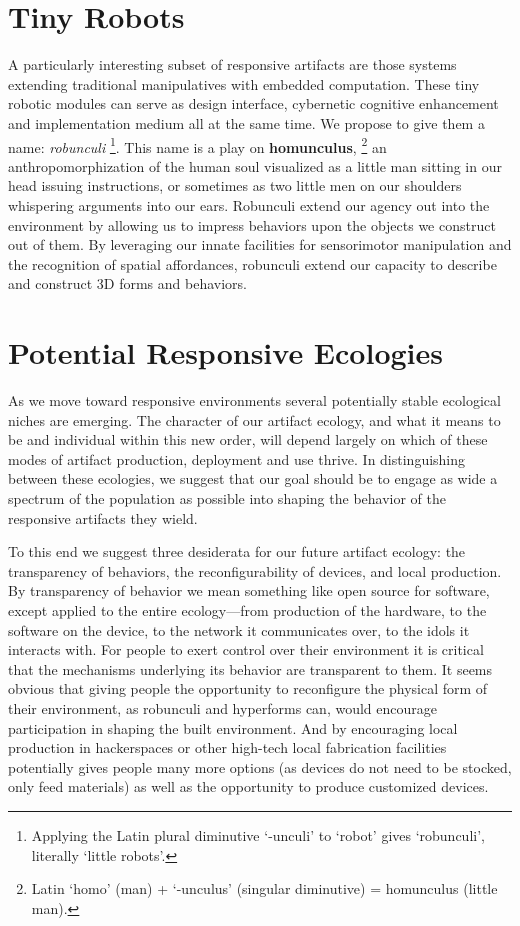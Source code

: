 \section{Tiny Robots}
%
A particularly interesting subset of responsive artifacts are those systems extending traditional manipulatives with embedded computation.
These tiny robotic modules can serve as design interface, cybernetic cognitive enhancement and implementation medium all at the same time. We propose to give them a name: \emph{robunculi}%
\footnote{Applying the Latin plural diminutive `-unculi' to `robot' gives `robunculi', literally `little robots'.}.
This name is a play on \textbf{homunculus},%
\footnote{Latin `homo' (man) + `-unculus' (singular diminutive) = homunculus (little man).}
an anthropomorphization of the human soul visualized as a little man sitting in our head issuing instructions, or sometimes as two little men on our shoulders whispering arguments into our ears. 
Robunculi extend our agency out into the environment by allowing us to impress behaviors upon the objects we construct out of them. 
By leveraging our innate facilities for sensorimotor manipulation and the recognition of spatial affordances, robunculi extend our capacity to describe and construct 3D forms and behaviors.

\section{Potential Responsive Ecologies}
%
As we move toward responsive environments several potentially stable ecological niches are emerging. 
The character of our artifact ecology, and what it means to be and individual within this new order, will depend largely on which of these modes of artifact production, deployment and use thrive. 
In distinguishing between these ecologies, we suggest that our goal should be to engage as wide a spectrum of the population as possible into shaping the behavior of the responsive artifacts they wield. 

To this end we suggest three desiderata for our future artifact ecology: the transparency of behaviors, the reconfigurability of devices, and local production.
By transparency of behavior we mean something like open source for software, except applied to the entire ecology---from production of the hardware, to the software on the device, to the network it communicates over, to the idols it interacts with. 
For people to exert control over their environment it is critical that the mechanisms underlying its behavior are transparent to them. 
It seems obvious that giving people the opportunity to reconfigure the physical form of their environment, as robunculi and hyperforms can, would encourage participation in shaping the built environment. 
And by encouraging local production in hackerspaces or other high-tech local fabrication facilities potentially gives people many more options (as devices do not need to be stocked, only feed materials) as well as the opportunity to produce customized devices. 

